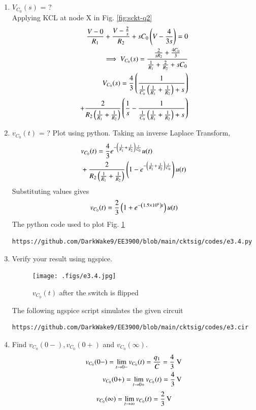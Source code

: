 \documentclass[journal,12pt,twocolumn]{IEEEtran}
\renewcommand\thesection{\arabic{section}}
\begin{document}
\begin{enumerate}[label=\arabic*.,ref=\thesection.\theenumi]
\item $V_{C_0}(s)$ = ?
\solution\\
Applying KCL at node X in Fig. \ref{fig:sckt-q2}
\begin{align}
	\frac{V - 0}{R_1} + \frac{V - \frac{2}{s}}{R_2} + sC_0\left(V - \frac{4}{3s}\right) = 0 \\
	\implies V_{C_0}(s) = \frac{\frac{2}{sR_2} + \frac{4C_0}{3}}{\frac{1}{R_1} + \frac{2}{R_2} + sC_0}\\
	\label{eq:v2-s}
	V_{C_0}(s) = \frac{4}{3}\left(\frac{1}{\frac{1}{C_0}\left(\frac{1}{R_1} + \frac{1}{R_2}\right)+s}\right) \nonumber \\
	+ \frac{2}{R_2\left(\frac{1}{R_1} +\frac{1}{R_2}\right)}\left(\frac{1}{s} - \frac{1}{\frac{1}{C_0}\left(\frac{1}{R_1} + \frac{1}{R_2}\right) + s}\right)
\end{align}
\item $v_{C_0}(t)$ = ? Plot using python.
Taking an inverse Laplace Transform,
\begin{align}
	&v_{C_0}(t) = \frac{4}{3}e^{-\left(\frac{1}{R_1} + \frac{1}{R_2}\right)\frac{t}{C_0}}u(t) \nonumber \\ 
	&+ \frac{2}{R_2\left(\frac{1}{R_1}+\frac{1}{R_2}\right)}\left(1 - e^{-\left(\frac{1}{R_1} + \frac{1}{R_2}\right)\frac{t}{C_0}}\right)u(t)
\end{align}
Substituting values gives
\begin{align}
	v_{C_0}(t) = \frac{2}{3}\left(1 +e^{-\left(1.5 \times 10^6\right)t}\right)u(t)
	\label{eq:v2-t}
\end{align}
The python code used to plot Fig. \ref{fig:v2-t}
\begin{lstlisting}
https://github.com/DarkWake9/EE3900/blob/main/cktsig/codes/e3.4.py
\end{lstlisting}
\item Verify your result using ngspice.\\
\solution
\begin{figure}[!htb]
	\texttt{[image: .figs/e3.4.jpg]}
	\caption{$v_{C_0}(t)$ after the switch is flipped}
	\label{fig:v2-t}
\end{figure}
 The following ngspice script simulates the given circuit
\begin{lstlisting}
https://github.com/DarkWake9/EE3900/blob/main/cktsig/codes/e3.cir
\end{lstlisting}
\item Find $v_{C_0}(0-), v_{C_0}(0+)$ and  $v_{C_0}(\infty) $.\\
\solution
\begin{align}
	v_{C_0}(0-) = \lim_{t \to 0-}v_{C_0}(t) = \frac{q_1}{C} = \frac{4}{3}\text{ V}\\
	v_{C_0}(0+) = \lim_{t \to 0+}v_{C_0}(t) = \SI[parse-numbers=false]{\frac{4}{3}}{\V}
\end{align}
\begin{align}
	v_{C_0}(\infty) = \lim_{t \to \infty}v_{C_0}(t) = \SI[parse-numbers=false]{\frac{2}{3}}{\V}
\end{align}


\end{enumerate}
\end{document}
